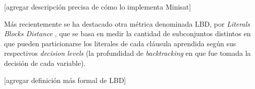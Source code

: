 	[agregar descripción precisa de cómo lo implementa Minisat]


Más recientemente se ha destacado otra métrica denominada LBD, por \emph{Literals Blocks Distance} \cite{Audemard:2009:PLC:1661445.1661509}, que se basa en medir la cantidad de subconjuntos distintos en que pueden particionarse los literales de cada cláusula aprendida según sus respectivos \emph{decision levels} (la profundidad de \emph{backtracking} en que fue tomada la decisión de cada variable).


	[agregar definición más formal de LBD]




